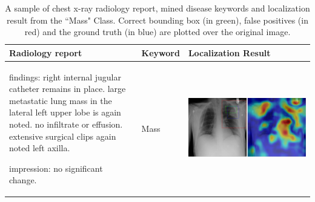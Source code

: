 \documentclass[10pt,twocolumn,letterpaper]{article}
\begin{document}
\begin{table}
	\begin{center}
		\begin{tabular}{p{15em}|p{6em}|p{23em}}
			\hline
			Radiology report & Keyword & Localization Result\\
			\hline\hline
			findings: right internal jugular catheter remains in place. large metastatic lung mass in the lateral left upper lobe is again noted. no infiltrate or effusion. extensive surgical clips again noted left axilla. 
			
			impression: no significant change.
			& Mass
			&\vspace{0cm}\includegraphics[width=1\linewidth]{00101417_01_c_5.png} \\
			\hline
		\end{tabular}
	\end{center}
	\caption{A sample of chest x-ray radiology report, mined disease keywords and localization result from the ``Mass" Class. Correct bounding box (in green), false positives (in red) and the ground truth (in blue) are plotted over the original image.}
	\label{tab:Loc_example_5}
\end{table}
\end{document}
